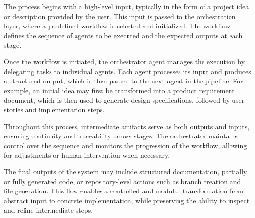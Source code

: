 \documentclass[a4paper,12pt]{report}
\begin{document}
The process begins with a high-level input, typically in the form of a project idea or description provided by the user. This input is passed to the orchestration layer, where a predefined workflow is selected and initialized. The workflow defines the sequence of agents to be executed and the expected outputs at each stage.

Once the workflow is initiated, the orchestrator agent manages the execution by delegating tasks to individual agents. Each agent processes its input and produces a structured output, which is then passed to the next agent in the pipeline. For example, an initial idea may first be transformed into a product requirement document, which is then used to generate design specifications, followed by user stories and implementation steps.

Throughout this process, intermediate artifacts serve as both outputs and inputs, ensuring continuity and traceability across stages. The orchestrator maintains control over the sequence and monitors the progression of the workflow, allowing for adjustments or human intervention when necessary.

The final outputs of the system may include structured documentation, partially or fully generated code, or repository-level actions such as branch creation and file generation. This flow enables a controlled and modular transformation from abstract input to concrete implementation, while preserving the ability to inspect and refine intermediate steps.
\end{document}
